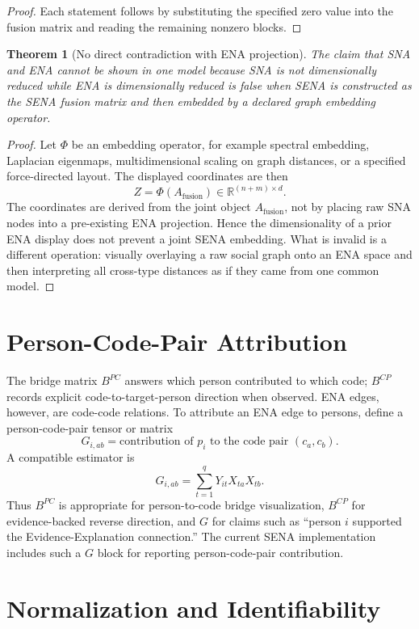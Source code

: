 \documentclass[11pt]{article}
\newtheorem{theorem}{Theorem}
\theoremstyle{definition}
\newcommand{\R}{\mathbb{R}}
\newcommand{\Af}{A_{\mathrm{fusion}}}
\begin{document}
\begin{proof}
Each statement follows by substituting the specified zero value into
the fusion matrix and reading the remaining nonzero blocks.
\end{proof}

\begin{theorem}[No direct contradiction with ENA projection]
The claim that SNA and ENA cannot be shown in one model because SNA is not
dimensionally reduced while ENA is dimensionally reduced is false when SENA is
constructed as the SENA fusion matrix and then embedded by a declared graph
embedding operator.
\end{theorem}

\begin{proof}
Let \(\Phi\) be an embedding operator, for example spectral embedding,
Laplacian eigenmaps, multidimensional scaling on graph distances, or a
specified force-directed layout. The displayed coordinates are then
\[
Z=\Phi(\Af)\in\R^{(n+m)\times d}.
\]
The coordinates are derived from the joint object \(\Af\), not by placing raw
SNA nodes into a pre-existing ENA projection. Hence the dimensionality of a
prior ENA display does not prevent a joint SENA embedding. What is invalid is a
different operation: visually overlaying a raw social graph onto an ENA space
and then interpreting all cross-type distances as if they came from one common
model.
\end{proof}

\section{Person-Code-Pair Attribution}

The bridge matrix \(B^{PC}\) answers which person contributed to which code;
\(B^{CP}\) records explicit code-to-target-person direction when observed. ENA
edges, however, are code-code relations. To attribute an ENA edge to persons,
define a person-code-pair tensor or matrix
\[
G_{i,ab}=\text{contribution of }p_i\text{ to the code pair }(c_a,c_b).
\]
A compatible estimator is
\[
G_{i,ab}=\sum_{t=1}^q Y_{it}X_{ta}X_{tb}.
\]
Thus \(B^{PC}\) is appropriate for person-to-code bridge visualization,
\(B^{CP}\) for evidence-backed reverse direction, and \(G\) for claims such as ``person \(i\) supported the
Evidence-Explanation connection.'' The current SENA implementation includes
such a \(G\) block for reporting person-code-pair contribution.

\section{Normalization and Identifiability}
\end{document}
